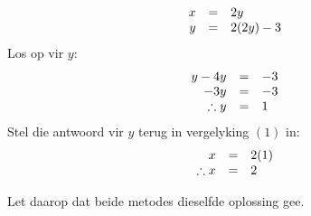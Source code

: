 \begin{equation*}
\begin{array}{ccl}\hfill x& =& 2y\hfill \\
 \hfill y& =& 2(2y)-3\hfill 
\end{array}
\end{equation*}
Los op vir $y$:
\begin{equation*}
\begin{array}{ccl}
 \hfill y-4y& =& -3\hfill \\
 \hfill -3y& =& -3\hfill \\ 
\hfill \therefore y& =& 1\hfill 
\end{array}
\end{equation*}
Stel die antwoord vir $y$ terug in vergelyking $(1)$ in:
\begin{equation*}
\begin{array}{ccl}
 \hfill x& =& 2(1)\hfill \\
 \therefore x&=& 2\hfill \end{array}
\end{equation*}

Let daarop dat beide metodes dieselfde oplossing gee.

